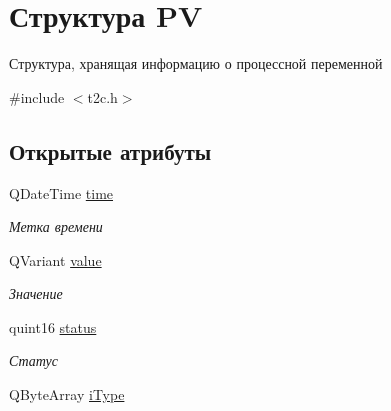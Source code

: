 \hypertarget{struct_p_v}{\section{Структура P\-V}
\label{struct_p_v}
}


Структура, хранящая информацию о процессной переменной  




{\ttfamily \#include $<$t2c.\-h$>$}

\subsection*{Открытые атрибуты}
\begin{DoxyCompactItemize}
\item 
\hypertarget{struct_p_v_abf7a2b104815f063f098b3f12cb5efb4}{Q\-Date\-Time \hyperlink{struct_p_v_abf7a2b104815f063f098b3f12cb5efb4}{time}}\label{struct_p_v_abf7a2b104815f063f098b3f12cb5efb4}

\begin{DoxyCompactList}\small\item\em Метка времени \end{DoxyCompactList}\item 
\hypertarget{struct_p_v_a1e4608363410a01ca0b73d61fb898656}{Q\-Variant \hyperlink{struct_p_v_a1e4608363410a01ca0b73d61fb898656}{value}}\label{struct_p_v_a1e4608363410a01ca0b73d61fb898656}

\begin{DoxyCompactList}\small\item\em Значение \end{DoxyCompactList}\item 
\hypertarget{struct_p_v_a02551777c1773cd8d67195be4ba18653}{quint16 \hyperlink{struct_p_v_a02551777c1773cd8d67195be4ba18653}{status}}\label{struct_p_v_a02551777c1773cd8d67195be4ba18653}

\begin{DoxyCompactList}\small\item\em Статус \end{DoxyCompactList}\item 
\hypertarget{struct_p_v_a8929ed79170ed8f87817646de10799fe}{Q\-Byte\-Array \hyperlink{struct_p_v_a8929ed79170ed8f87817646de10799fe}{i\-Type}}\label{struct_p_v_a8929ed79170ed8f87817646de10799fe}


\end{DoxyCompactItemize}
